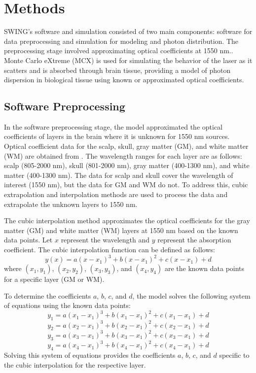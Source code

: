 \documentclass[journal,twoside,web]{ieeecolor}
\begin{document}
\section{Methods}
\label{sec:methods}
SWING's software and simulation consisted of two main components: software for data preprocessing and simulation for modeling and photon distribution. 
The preprocessing stage involved approximating optical coefficients at 1550 nm.. Monte Carlo eXtreme (MCX) is used for simulating the 
behavior of the laser as it scatters and is absorbed through brain tissue, providing a model of photon dispersion in biological tissue using known or 
approximated optical coefficients.

\subsection{Software Preprocessing}
In the software preprocessing stage, the model approximated the optical coefficients of layers in the brain where it is unknown for 1550 nm sources. 
Optical coefficient data for the scalp, skull, gray matter (GM), and white matter (WM) are obtained from \cite{b5}. The wavelength ranges for each layer are as follows: 
scalp (805-2000 nm), skull (801-2000 nm), gray matter (400-1300 nm), and white matter (400-1300 nm). The data for scalp and skull cover the wavelength of interest 
(1550 nm), but the data for GM and WM do not. To address this, cubic extrapolation and interpolation methods are used to process the data and extrapolate the 
unknown layers to 1550 nm. 

The cubic interpolation method approximates the optical coefficients for the gray matter (GM) and white matter (WM) layers at 1550 nm based on the 
known data points. Let $x$ represent the wavelength and $y$ represent the absorption coefficient. The cubic interpolation function can be defined as follows:
\begin{equation}
    \label{eq:cubicEq1}
    y(x) = a(x-x_1)^3 + b(x-x_1)^2 + c(x-x_1) + d
\end{equation}
where $(x_1, y_1)$, $(x_2, y_2)$, $(x_3, y_3)$, and $(x_4, y_4)$ are the known data points for a specific layer (GM or WM).

To determine the coefficients $a$, $b$, $c$, and $d$, the model solves the following system of equations using the known data points:
\begin{equation}
    \label{eq:cubicEq2}
    y_1 = a(x_1-x_1)^3 + b(x_1-x_1)^2 + c(x_1-x_1) + d 
\end{equation}
\begin{equation}
    \label{eq:cubicEq3}
    y_2 = a(x_2-x_1)^3 + b(x_2-x_1)^2 + c(x_2-x_1) + d 
\end{equation}
\begin{equation}
    \label{eq:cubicEq4}
    y_3 = a(x_3-x_1)^3 + b(x_3-x_1)^2 + c(x_3-x_1) + d 
\end{equation}
\begin{equation}
    \label{eq:cubicEq5}
    y_4 = a(x_4-x_1)^3 + b(x_4-x_1)^2 + c(x_4-x_1) + d 
\end{equation}
Solving this system of equations provides the coefficients $a$, $b$, $c$, and $d$ specific to the cubic interpolation for the respective layer.
\end{document}
